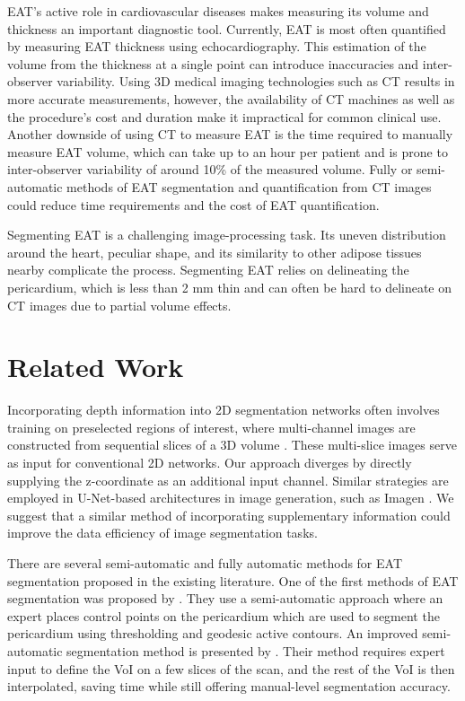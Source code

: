 EAT's active role in cardiovascular diseases makes measuring its volume and thickness an important diagnostic tool. Currently, EAT is most often quantified by measuring EAT thickness using echocardiography. This estimation of the volume from the thickness at a single point can introduce inaccuracies and inter-observer variability. Using 3D medical imaging technologies such as CT results in more accurate measurements, however, the availability of CT machines as well as the procedure's cost and duration make it impractical for common clinical use. Another downside of using CT to measure EAT is the time required to manually measure EAT volume, which can take up to an hour per patient \cite{Militello2019} and is prone to inter-observer variability of around 10\% \cite{Marwan2013} of the measured volume. Fully or semi-automatic methods of EAT segmentation and quantification from CT images could reduce time requirements and the cost of EAT quantification.

Segmenting EAT is a challenging image-processing task. Its uneven distribution around the heart, peculiar shape, and its similarity to other adipose tissues nearby complicate the process. Segmenting EAT relies on delineating the pericardium, which is less than 2 mm thin and can often be hard to delineate on CT images due to partial volume effects.

\section{Related Work}

Incorporating depth information into 2D segmentation networks often involves training on preselected regions of interest, where multi-channel images are constructed from sequential slices of a 3D volume \cite{wenConvolutionalNeuralNetworks2020}. These multi-slice images serve as input for conventional 2D networks. Our approach diverges by directly supplying the z-coordinate as an additional input channel. Similar strategies are employed in U-Net-based architectures in image generation, such as Imagen \cite{sahariaPhotorealisticTexttoImageDiffusion2022}. We suggest that a similar method of incorporating supplementary information could improve the data efficiency of image segmentation tasks.

There are several semi-automatic and fully automatic methods for EAT segmentation proposed in the existing literature. One of the first methods of EAT segmentation was proposed by \citet{Coppini2010}. They use a semi-automatic approach where an expert places control points on the pericardium which are used to segment the pericardium using thresholding and geodesic active contours. An improved semi-automatic segmentation method is presented by \citet{Militello2019}. Their method requires expert input to define the VoI on a few slices of the scan, and the rest of the VoI is then interpolated, saving time while still offering manual-level segmentation accuracy.

